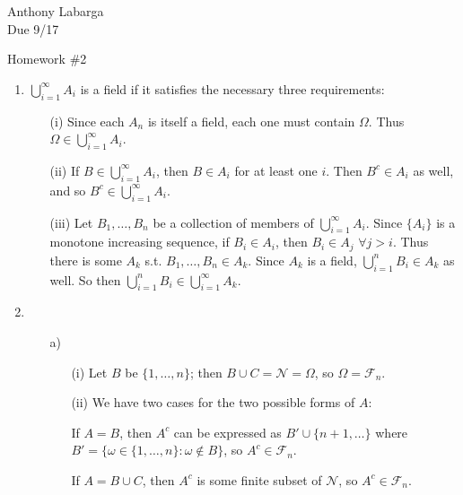 \documentclass[12pt]{article}
\begin{document}
\begin{flushright}

Anthony Labarga\\
Due 9/17
\end{flushright}

\begin{center}
Homework \#2
\end{center}

\begin{enumerate}

\item $\bigcup_{i=1}^\infty A_i$ is a field if it satisfies the necessary three requirements:

\begin{itemize}
\item[(i)] Since each $A_n$ is itself a field, each one must contain $\Omega$. Thus $\Omega \in \bigcup^\infty_{i=1} A_i$.

\item[(ii)] If $B \in \bigcup^\infty_{i=1} A_i$, then $B \in A_i$ for at least one $i$. Then $B^c \in A_i$ as well, and so $B^c \in \bigcup^\infty_{i=1} A_i$.

\item[(iii)] Let $B_1,\dots,B_n$ be a collection of members of $ \bigcup^\infty_{i=1} A_i$. Since $\{A_i\}$ is a monotone increasing sequence, if $B_i \in A_i$, then $B_i \in A_j$ $\forall j>i$. Thus there is some $A_k$ s.t. $B_1,\dots,B_n \in A_k$. Since $A_k$ is a field, $\bigcup^n_{i=1} B_i \in A_k$ as well. So then $\bigcup^n_{i=1} B_i \in \bigcup^\infty_{i=1} A_k$.

\end{itemize}

\item

\begin{itemize}
\item[a)] 

\begin{itemize}
\item[(i)] Let $B$ be $\{1,\dots,n\}$; then $B \cup C = \mathcal{N} = \Omega$, so $\Omega=\mathcal{F}_n$.

\item[(ii)] We have two cases for the two possible forms of $A$:

If $A=B$, then $A^c$ can be expressed as $B' \cup\{n+1,\dots\}$ where $B'=\{\omega \in \{1,\dots,n\}: \omega \notin B\}$, so $A^c \in \mathcal{F}_n$.

If $A=B\cup C$, then $A^c$ is some finite subset of $\mathcal{N}$, so $A^c \in \mathcal{F}_n$.


\end{itemize}
\end{itemize}
\end{enumerate}
\end{document}
